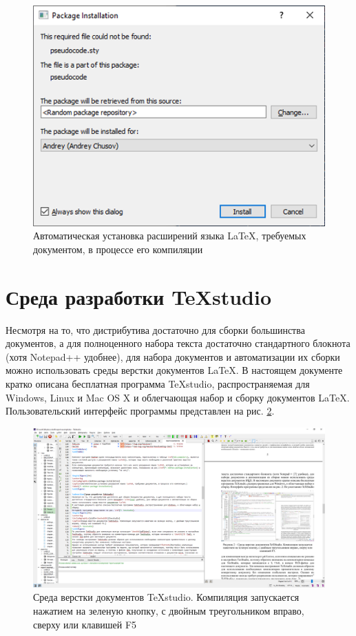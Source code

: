 \documentclass[workbook]{fefudoc}
\begin{document}
\begin{figure}
\centering
\includegraphics{workbook-extras/miktex-package-installation}
\caption{Автоматическая установка расширений языка \LaTeX, требуемых документом, в процессе его компиляции}
\label{автоустановка расширений miktex}
\end{figure}

\section{Среда разработки TeXstudio}\label{раздел про texstudio}
Несмотря на то, что дистрибутива достаточно для сборки большинства документов, а для полноценного набора текста достаточно стандартного блокнота (хотя Notepad++ \cite{npp} удобнее), для набора документов и автоматизации их сборки можно использовать среды верстки документов \LaTeX.
В настоящем документе кратко описана бесплатная программа TeXstudio, распространяемая для Windows, Linux и Mac OS X и облегчающая набор и сборку документов \LaTeX{}.
Пользовательский интерфейс программы представлен на рис. \ref{скриншот texstudio}.
\begin{figure}
\centering
\includegraphics[width=\textwidth]{workbook-extras/texstudio}
\caption{Среда верстки документов TeXstudio. Компиляция запускается нажатием на зеленую кнопку, с двойным треугольником вправо, сверху или клавишей F5}
\label{скриншот texstudio}
\end{figure}
\end{document}
